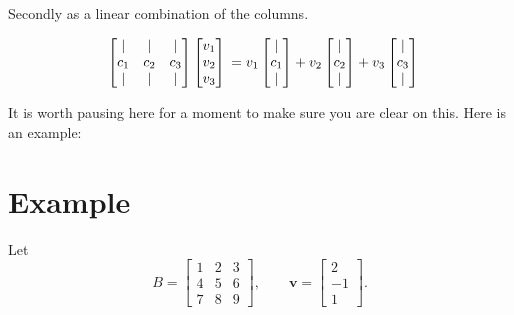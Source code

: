 Secondly as a linear combination of the columns.

\[
\begin{array}{c@{\,}c}
\begin{bmatrix}
| & | & | \\
c_1 & c_2 & c_3 \\
| & | & | \\
\end{bmatrix}
\begin{bmatrix}
v_1 \\
v_2 \\
v_3 \\
\end{bmatrix}
\end{array}
=
v_1 \begin{bmatrix}
| \\
c_1 \\
| \\
\end{bmatrix}
+
v_2 \begin{bmatrix}
| \\
c_2 \\
| \\
\end{bmatrix}
+
v_3 \begin{bmatrix}
| \\
c_3 \\
| \\
\end{bmatrix}
\]

It is worth pausing here for a moment to make sure you are clear on this. Here is an example:

\section*{Example}

Let
\[
B = \begin{bmatrix}
1 & 2 & 3 \\
4 & 5 & 6 \\
7 & 8 & 9
\end{bmatrix}, \qquad
\mathbf{v} = \begin{bmatrix} 2 \\ -1 \\ 1 \end{bmatrix}.
\]

